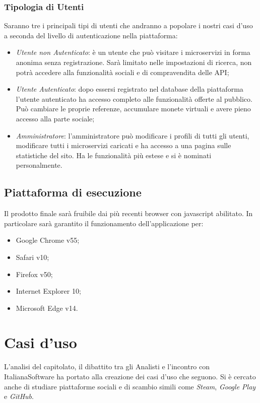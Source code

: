 \documentclass[12pt,a4paper,titlepage]{article}
\begin{document}
	\subsubsection{Tipologia di Utenti}
	Saranno tre i principali tipi di utenti che andranno a popolare i nostri casi d'uso a seconda del livello di autenticazione nella piattaforma:
	\begin{itemize}
		\item \textit{Utente non Autenticato}: è un utente che può visitare i microservizi in forma anonima senza registrazione. Sarà limitato nelle impostazioni di ricerca, non potrà accedere alla funzionalità sociali e di compravendita delle API;
		\item \textit{Utente Autenticato}: dopo essersi registrato nel database della piattaforma l'utente autenticato ha accesso completo alle funzionalità offerte al pubblico. Può cambiare le proprie referenze, accumulare monete virtuali e avere pieno accesso alla parte sociale;
		\item \textit{Amministratore}: l'amministratore può modificare i profili di tutti gli utenti, modificare tutti i microservizi caricati e ha accesso a una pagina sulle statistiche del sito. Ha le funzionalità più estese e si è nominati personalmente. 
	\end{itemize}
	
	\subsection{Piattaforma di esecuzione}
	Il prodotto finale sarà fruibile dai più recenti browser con javascript abilitato. In particolare sarà garantito il funzionamento dell'applicazione per:
	\begin{itemize}
		\item Google Chrome v55;
		\item Safari v10;
		\item Firefox v50;
		\item Internet Explorer 10;
		\item Microsoft Edge v14.
	\end{itemize}
	\newpage
	
	\section{Casi d'uso}
	L'analisi del capitolato, il dibattito tra gli Analisti e l'incontro con ItalianaSoftware ha portato alla creazione dei casi d'uso che seguono. Si è cercato anche di studiare piattaforme sociali e di scambio simili come \textit{Steam}, \textit{Google Play} e \textit{GitHub}.
	
\end{document}
